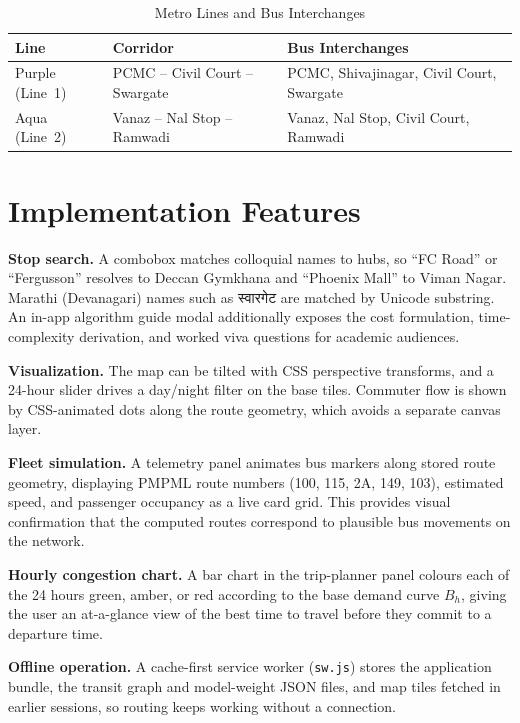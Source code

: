 \documentclass[conference]{IEEEtran}
\begin{document}
\begin{table}[h]
\caption{Metro Lines and Bus Interchanges}
\label{tab:metro}
\centering
\begin{tabular}{llp{3.2cm}}
\toprule
\textbf{Line} & \textbf{Corridor} & \textbf{Bus Interchanges} \\
\midrule
Purple (Line~1) & PCMC -- Civil Court -- Swargate & PCMC, Shivajinagar, Civil Court, Swargate \\
Aqua (Line~2)   & Vanaz -- Nal Stop -- Ramwadi    & Vanaz, Nal Stop, Civil Court, Ramwadi \\
\bottomrule
\end{tabular}
\end{table}

\section{Implementation Features}

\textbf{Stop search.} A combobox matches colloquial names to hubs, so ``FC Road'' or ``Fergusson'' resolves to Deccan Gymkhana and ``Phoenix Mall'' to Viman Nagar. Marathi (Devanagari) names such as स्वारगेट are matched by Unicode substring. An in-app algorithm guide modal additionally exposes the cost formulation, time-complexity derivation, and worked viva questions for academic audiences.

\textbf{Visualization.} The map can be tilted with CSS perspective transforms, and a 24-hour slider drives a day/night filter on the base tiles. Commuter flow is shown by CSS-animated dots along the route geometry, which avoids a separate canvas layer.

\textbf{Fleet simulation.} A telemetry panel animates bus markers along stored route geometry, displaying PMPML route numbers (100, 115, 2A, 149, 103), estimated speed, and passenger occupancy as a live card grid. This provides visual confirmation that the computed routes correspond to plausible bus movements on the network.

\textbf{Hourly congestion chart.} A bar chart in the trip-planner panel colours each of the 24 hours green, amber, or red according to the base demand curve $B_h$, giving the user an at-a-glance view of the best time to travel before they commit to a departure time.

\textbf{Offline operation.} A cache-first service worker (\texttt{sw.js}) stores the application bundle, the transit graph and model-weight JSON files, and map tiles fetched in earlier sessions, so routing keeps working without a connection.
\end{document}

